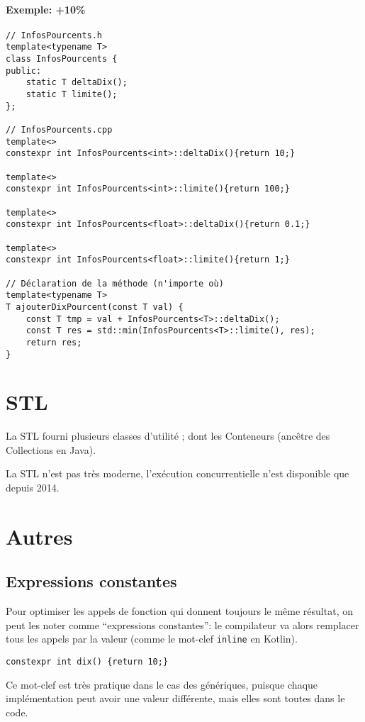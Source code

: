 \documentclass[10pt,a4paper,french]{article}
\begin{document}
\paragraph{Exemple: +10\%}
\begin{verbatim}
// InfosPourcents.h
template<typename T>
class InfosPourcents {
public:
    static T deltaDix();
    static T limite();
};

// InfosPourcents.cpp
template<>
constexpr int InfosPourcents<int>::deltaDix(){return 10;}

template<>
constexpr int InfosPourcents<int>::limite(){return 100;}

template<>
constexpr int InfosPourcents<float>::deltaDix(){return 0.1;}

template<>
constexpr int InfosPourcents<float>::limite(){return 1;}

// Déclaration de la méthode (n'importe où)
template<typename T>
T ajouterDixPourcent(const T val) {
    const T tmp = val + InfosPourcents<T>::deltaDix();
    const T res = std::min(InfosPourcents<T>::limite(), res);
    return res;
}
\end{verbatim}

\section{STL}

La STL fourni plusieurs classes d'utilité ; dont les Conteneurs (ancêtre des Collections en Java).

La STL n'est pas très moderne, l'exécution concurrentielle n'est disponible que depuis 2014.

\section{Autres}

\subsection{Expressions constantes}

Pour optimiser les appels de fonction qui donnent toujours le même résultat, on peut les noter comme ``expressions constantes'': le compilateur va alors remplacer tous les appels par la valeur (comme le mot-clef \texttt{inline} en Kotlin).

\begin{verbatim}
constexpr int dix() {return 10;}
\end{verbatim}

Ce mot-clef est très pratique dans le cas des génériques, puisque chaque implémentation peut avoir une valeur différente, mais elles sont toutes dans le code.

\appendix %

\end{document}
